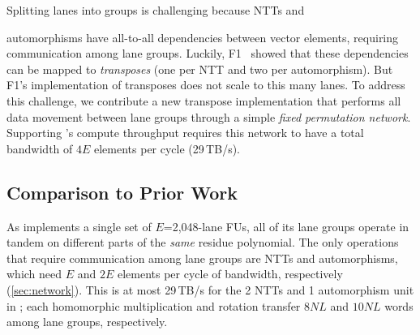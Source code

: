 Splitting lanes into groups is challenging because NTTs and

\noindent automorphisms have all-to-all dependencies between vector elements,
requiring communication among lane groups.
Luckily, F1~\cite{feldmann:micro21:f1} showed that these
dependencies can be mapped to \emph{transposes} (one per NTT and two
per automorphism).
But F1's implementation of transposes does not scale to this many lanes.
To address this challenge, we contribute a new transpose implementation that
performs all data movement between lane groups
through a simple \emph{fixed permutation network}.
Supporting \name's compute throughput requires this network to have a
total bandwidth of $4E$ elements per cycle (29\,TB/s).

\subsection{Comparison to Prior Work}
\label{sec:comparison}


As \name implements a single set of $E$=2,048-lane FUs, all of its lane groups
operate in tandem on different parts of the \emph{same} residue polynomial.
The only operations that require communication among lane groups are NTTs and automorphisms,
which need $E$ and $2E$ elements per cycle of bandwidth, respectively (\autoref{sec:network}).
This is at most 29\,TB/s for the 2 NTTs and 1 automorphism unit in \name;
each homomorphic multiplication and rotation transfer $8NL$ and $10NL$ words among lane groups, respectively.

